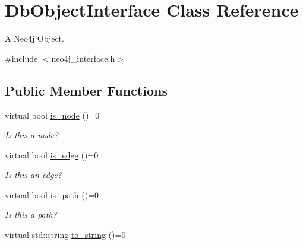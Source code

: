 \hypertarget{classDbObjectInterface}{}\section{Db\+Object\+Interface Class Reference}
\label{classDbObjectInterface}


A Neo4j Object.  




{\ttfamily \#include $<$neo4j\+\_\+interface.\+h$>$}

\subsection*{Public Member Functions}
\begin{DoxyCompactItemize}
\item 
virtual bool \hyperlink{classDbObjectInterface_a3c1c9af939a1e038a082930e57c2afca}{is\+\_\+node} ()=0
\begin{DoxyCompactList}\small\item\em Is this a node? \end{DoxyCompactList}\item 
virtual bool \hyperlink{classDbObjectInterface_af2ab883d4af94b4e7bd25a117bb1f39b}{is\+\_\+edge} ()=0
\begin{DoxyCompactList}\small\item\em Is this an edge? \end{DoxyCompactList}\item 
virtual bool \hyperlink{classDbObjectInterface_ad4ec7a23a86d18fea543376dc6bf6c56}{is\+\_\+path} ()=0
\begin{DoxyCompactList}\small\item\em Is this a path? \end{DoxyCompactList}\item 
virtual std\+::string \hyperlink{classDbObjectInterface_a93c98f06ce3f5493525dd19b337cebbc}{to\+\_\+string} ()=0\hypertarget{classDbObjectInterface_a93c98f06ce3f5493525dd19b337cebbc}{}\label{classDbObjectInterface_a93c98f06ce3f5493525dd19b337cebbc}


\end{DoxyCompactItemize}
